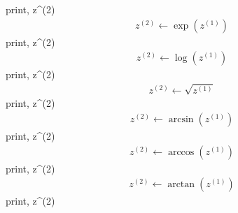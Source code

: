 \documentclass[a4paper,fleqn]{ltjsarticle}
\begin{document}
  print, z^{(2)}
  \begin{align}
  z^{(2)} \leftarrow \exp\left(z^{(1)}\right)
  \end{align}
  print, z^{(2)}
  \begin{align}
  z^{(2)} \leftarrow \log\left(z^{(1)}\right)
  \end{align}
  print, z^{(2)}
  \begin{align}
  z^{(2)} \leftarrow \sqrt{z^{(1)}}
  \end{align}
  print, z^{(2)}
  \begin{align}
  z^{(2)} \leftarrow \arcsin\left(z^{(1)}\right)
  \end{align}
  print, z^{(2)}
  \begin{align}
  z^{(2)} \leftarrow \arccos\left(z^{(1)}\right)
  \end{align}
  print, z^{(2)}
  \begin{align}
  z^{(2)} \leftarrow \arctan\left(z^{(1)}\right)
  \end{align}
  print, z^{(2)}
\end{document}
